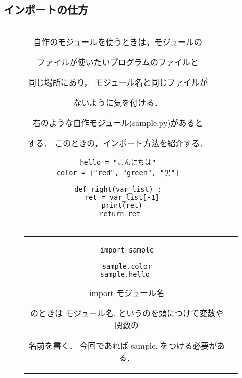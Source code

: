 \documentclass{jsarticle}
\begin{document}
\newpage
\subsection{インポートの仕方}
\begin{figure}[h]
	\begin{tabular}{cc}
		\begin{minipage}[t]{.45\textwidth}
			自作のモジュールを使うときは，モジュールの\par
			ファイルが使いたいプログラムのファイルと \par
			同じ場所にあり， モジュール名と同じファイルが\par ないように気を付ける． \par
			右のような自作モジュール(sample.py)があると \par する．
			このときの，インポート方法を紹介する．
		\end{minipage} \hspace{15mm}
		\begin{minipage}[t]{.4\textwidth}
			\vspace{-10mm}
			\begin{lstlisting}[caption=sample.py]
hello = "こんにちは"
color = ["red", "green", "黒"]

def right(var_list) :
  ret = var_list[-1]
  print(ret)
  return ret \end{lstlisting}
		\end{minipage}
	\end{tabular}
\end{figure}


\begin{figure}[h]
	\begin{tabular}{cc}
		\begin{minipage}[t]{.4\textwidth}
			\begin{lstlisting}[caption=インポートの仕方-その1]
import sample

sample.color
sample.hello \end{lstlisting}
		\end{minipage} \hspace{5mm}
		\begin{minipage}[t]{.6\textwidth}
			\begin{screen}
				import モジュール名 \par
				のときは モジュール名. というのを頭につけて変数や関数の \par 名前を書く．
				今回であれば sample. をつける必要がある．
			\end{screen}
		\end{minipage}
	\end{tabular}
\end{figure}
\end{document}
